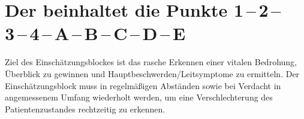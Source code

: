 \clearpage
\section{Der  beinhaltet die Punkte 
1\,--\,2\,--\,3\,--\,4\,--\,A\,--\,B\,--\,C\,--\,D\,--\,E}
\label{topic:ersteinschaetzung}
\label{topic:einschaetzungsblock}

\begin{quote}
\end{quote}

Ziel des Einschätzungsblockes ist das rasche Erkennen einer
vitalen Bedrohung, Überblick zu gewinnen und
Hauptbeschwerden/Leitsymptome zu ermitteln. Der
Einschätzungsblock muss in regelmäßigen Abständen sowie bei
Verdacht in angemessenem Umfang wiederholt werden, um eine
Verschlechterung des Patientenzustandes rechtzeitig zu
erkennen. 

